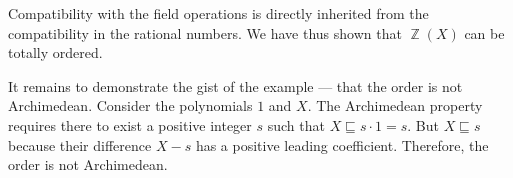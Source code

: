 \begin{example}
  Compatibility with the field operations is directly inherited from the compatibility in the rational numbers. We have thus shown that \( \BbbZ(X) \) can be totally ordered.

  It remains to demonstrate the gist of the example --- that the order is not Archimedean. Consider the polynomials \( 1 \) and \( X \). The Archimedean property requires there to exist a positive integer \( s \) such that \( X \sqsubseteq s \cdot 1 = s \). But \( X \sqsubseteq s \) because their difference \( X - s \) has a positive leading coefficient. Therefore, the order is not Archimedean.
\end{example}
